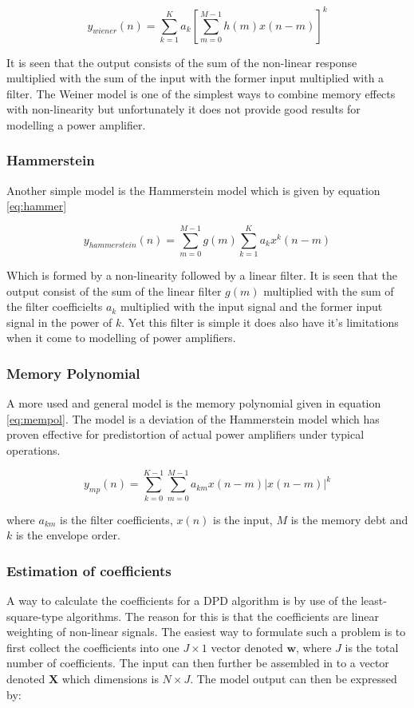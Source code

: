 \begin{equation}\label{eq:wiener}
y_{wiener}(n) = \sum_{k=1}^{K} a_k [\sum_{m=0}^{M-1}h(m)x(n-m)]^k
\end{equation} 

It is seen that the output consists of the sum of the non-linear response multiplied with the sum of the input with the former input multiplied with a filter. The Weiner model is one of the simplest ways to combine memory effects with non-linearity but unfortunately it does not provide good results for modelling a power amplifier. 

 
\subsubsection{Hammerstein} 
Another simple model is the Hammerstein model which is given by equation \ref{eq:hammer}

\begin{equation} \label{eq:hammer}
y_{hammerstein}(n) = \sum_{m=0}^{M-1}g(m)\sum_{k=1}^{K}a_k x^k(n-m)
\end{equation} 

Which is formed by a non-linearity followed by a linear filter. It is seen that the output consist of the sum of the linear filter $g(m)$ multiplied with the sum of the filter coefficielts $a_k$ multiplied with the input signal and the former input signal in the power of $k$. 
Yet this filter is simple it does also have it's limitations when it come to modelling of power amplifiers. 
   
\subsubsection{Memory Polynomial}

A more used and general model is the memory polynomial given in equation \ref{eq:mempol}. The model is a deviation of the Hammerstein model which has proven effective for predistortion of actual power amplifiers under typical operations.   

\begin{equation}\label{eq:mempol}
y_{mp}(n) = \sum_{k=0}^{K-1} \sum_{m=0}^{M-1} a_{km}x(n-m)|x(n-m)|^k
\end{equation}

where $a_{km}$ is the filter coefficients, $x(n)$ is the input, $M$ is the memory debt and $k$ is the envelope order.

\subsubsection{Estimation of coefficients}
A way to calculate the coefficients for a DPD algorithm is by use of the least-square-type algorithms. The reason for this is that the coefficients are linear weighting of non-linear signals. The easiest way to formulate such a problem is to first collect the coefficients into one $J \times 1$ vector denoted $\pmb{w}$, where $J$ is the total number of coefficients. The input can then further be assembled in to a vector denoted $\pmb{X}$ which dimensions is $N \times J$. The model output can then be expressed by: 

